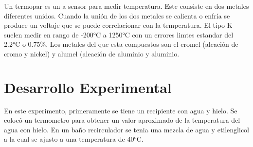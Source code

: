 \documentclass[12pt]{article}
\begin{document}
Un termopar es un a sensor para medir temperatura. Este consiste en dos metales diferentes unidos. Cuando la unión de los dos metales se calienta o enfría se produce un voltaje que se puede correlacionar con la temperatura. El tipo K suelen medir en rango de -200°C a 1250°C con un errores limtes estandar del 2.2°C o 0.75\%. Los metales del que esta compuestos son el cromel (aleación de cromo y nickel) y alumel (aleación de aluminio y aluminio\cite{termopar}.

\section{Desarrollo Experimental}
En este experimento, primeramente se tiene un recipiente con agua y hielo. Se colocó un termometro para obtener un valor aproximado de la temperatura del agua con hielo. En un baño recirculador se tenia una mezcla de agua y etilenglicol a la cual se ajusto a una temperatura de 40°C.
\end{document}
